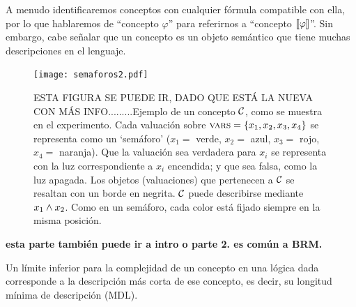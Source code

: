 
A menudo identificaremos conceptos con cualquier fórmula compatible con ella, por lo que hablaremos de ``concepto $\varphi$'' para referirnos a ``concepto $\llbracket \varphi\rrbracket$''. Sin embargo, cabe señalar que un concepto es un objeto semántico que tiene muchas descripciones en el lenguaje.
\color{black}



 \begin{figure}[t!]
 \vspace{-0.5cm}
  \centering
  \texttt{[image: semaforos2.pdf]}
  \caption{ESTA FIGURA SE PUEDE IR, DADO QUE ESTÁ LA NUEVA CON MÁS INFO.........Ejemplo de un concepto $\mathcal{C}$, como se muestra en el experimento. Cada valuación sobre $\textsc{vars}=\{x_1,x_2,x_3,x_4\}$ se representa como un `semáforo' ($x_{1}=$ verde, $x_2=$ azul, $x_3=$ rojo, $x_4=$ naranja). Que la valuación sea verdadera para $x_i$ se representa con la luz correspondiente a $x_i$ encendida; y que sea falsa, como la luz apagada. Los objetos (valuaciones) que pertenecen a $\mathcal{C}$ se resaltan con un borde en negrita. $\mathcal{C}$ puede describirse mediante $x_1\wedge x_2$. Como en un semáforo, cada color está fijado siempre en la misma posición.}
  \label{semaforos}
\end{figure}

\color{magenta}
{\bf esta parte también puede ir a intro o parte 2. es común a BRM. }

Un límite inferior para la complejidad de un concepto en una lógica dada corresponde a la descripción más corta de ese concepto, es decir, su longitud mínima de descripción (MDL).

